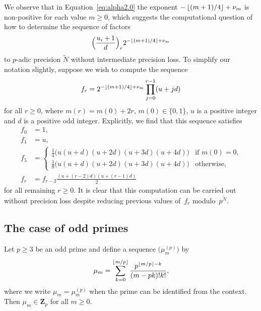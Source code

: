 \begin{rem}
We observe that in Equation~\eqref{eq:alpha2.0} the exponent 
$-\left\lfloor(m+1)/4\right\rfloor+\nu_m$ is non-positive for each value $m \geq 0$, 
which suggests the computational question of how to determine the 
sequence of factors 
\begin{equation*}
\Bigl(\frac{u_i+1}{d}\Bigr)_r 2^{- \left\lfloor(m+1)/4\right\rfloor + \nu_m}
\end{equation*}
to $p$-adic precision $\tilde{N}$ without intermediate precision loss.
To simplify our notation slightly, suppose we wish to compute the sequence
\begin{equation*}
f_r = 2^{- \left\lfloor(m+1)/4\right\rfloor + \nu_m} \prod_{j=0}^{r-1} (u + j d)
\end{equation*}
for all $r \geq 0$, where $m(r) = m(0) + 2r$, $m(0) \in \{0,1\}$, 
$u$ is a positive integer and $d$ is a positive odd integer.
Explicitly, we find that this sequence satisfies 
\begin{align*}
f_0 & = 1, \\
f_1 & = u, \\
f_5 & = \begin{cases}
        \displaystyle \tfrac{1}{4} \bigl( u (u + d) (u + 2d) (u + 3d) (u + 4d) \bigr)
            & \text{if $m(0)=0$,} \\
        \displaystyle \tfrac{1}{8} \bigl( u (u + d) (u + 2d) (u + 3d) (u + 4d) \bigr)
            & \text{otherwise,}
        \end{cases} \\
f_r & = f_{r-2} \frac{(u + (r - 2)d)(u + (r - 1)d)}{2}
\end{align*}
for all remaining $r \geq 0$.  It is clear that this computation can be carried 
out without precision loss despite reducing previous values of~$f_r$ 
modulo~$p^{\tilde{N}}$.
\end{rem}


\subsection{The case of odd primes}

\begin{lem} \label{lem:mup}
Let $p \geq 3$ be an odd prime and define a sequence 
$\bigl(\mu_m^{(p)}\bigr)$ by 
\begin{equation*}
\mu_m = \sum_{k=0}^{\left\lfloor m/p\right\rfloor} \frac{p^{\left\lfloor m/p\right\rfloor - k}}{(m-pk)! k!}, 
\end{equation*}
where we write $\mu_m = \mu_m^{(p)}$ when the prime can be identified 
from the context.  Then $\mu_m \in \mathbf{Z}_p$ for all $m \geq 0$.
\end{lem}

